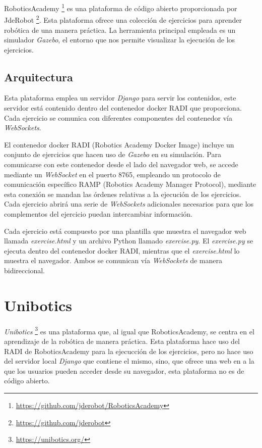 \documentclass[a4paper, 12pt]{book}
\begin{document}
RoboticsAcademy \footnote{\url{https://github.com/jderobot/RoboticsAcademy}} es una plataforma de código abierto proporcionada por JdeRobot \footnote{\url{https://github.com/jderobot}}. Esta plataforma ofrece una colección de ejercicios para aprender robótica de una manera práctica. La herramienta principal empleada es un simulador \emph{Gazebo}, el entorno que nos permite visualizar la ejecución de los ejercicios.

\subsection{Arquitectura}

Esta plataforma emplea un servidor \emph{Django} para servir los contenidos, este servidor está contenido dentro del contenedor docker RADI que proporciona. Cada ejercicio se comunica con diferentes componentes del contenedor vía \emph{WebSockets}.

El contenedor docker RADI (Robotics Academy Docker Image) incluye un conjunto de ejercicios que hacen uso de \emph{Gazebo} en su simulación. Para comunicarse con este contenedor desde el lado del navegador web, se accede mediante un \emph{WebSocket} en el puerto 8765, empleando un protocolo de comunicación específico RAMP (Robotics Academy Manager Protocol), mediante esta conexión se mandan las órdenes relativas a la ejecución de los ejercicios. Cada ejercicio abrirá una serie de \emph{WebSockets} adicionales necesarios para que los complementos del ejercicio puedan intercambiar información.

Cada ejercicio está compuesto por una plantilla que muestra el navegador web llamada \emph{exercise.html} y un archivo Python llamado \emph{exercise.py}. El \emph{exercise.py} se ejecuta dentro del contenedor docker RADI, mientras que el \emph{exercise.html} lo muestra el navegador. Ambos se comunican vía \emph{WebSockets} de manera bidireccional.

\section{Unibotics}
\label{section:unibotics}

\emph{Unibotics} \footnote{\url{https://unibotics.org/}} es una plataforma que, al igual que RoboticsAcademy, se centra en el aprendizaje de la robótica de manera práctica. Esta plataforma hace uso del RADI de RoboticsAcademy para la ejecucción de los ejercicios, pero no hace uso del servidor local \emph{Django} que contiene el mismo, sino, que ofrece una web en a la que los usuarios pueden acceder desde su navegador, esta plataforma no es de código abierto.
\end{document}
